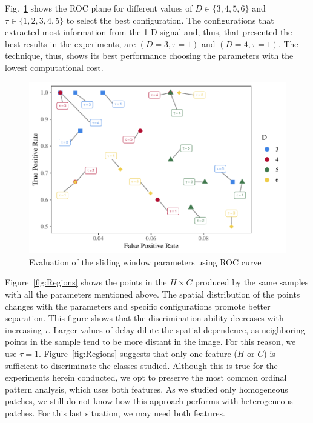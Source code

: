 \documentclass[journal]{IEEEtran}
\begin{document}
	Fig.~\ref{fig:ROC} shows the ROC plane for different values of $D \in \{3, 4, 5, 6 \} $ and $\tau \in \{1, 2, 3, 4, 5 \}$ to select the best configuration.
	The configurations that extracted most information from the \mbox{1-D} signal and, thus, that presented the best results in the experiments, are $(D = 3, \tau = 1)$ and $(D = 4, \tau = 1)$.
	The technique, thus, shows its best performance choosing the parameters with the lowest computational cost.
	
	\begin{figure}%
		\includegraphics[width=\columnwidth]{Figures/ROC.pdf}
		\caption{Evaluation of the sliding window parameters using ROC curve}
		\label{fig:ROC}
	\end{figure} 
	
	Figure~\ref{fig:Regions} shows the points in the $H\times C$ produced by the same samples with all the parameters mentioned above.
	The spatial distribution of the points changes with the parameters and specific configurations promote better separation.
	This figure shows that the discrimination ability decreases with increasing $\tau$.
	Larger values of delay dilute the spatial dependence, as neighboring points in the sample tend to be more distant in the image.
	For this reason, we use $\tau=1$. Figure~\ref{fig:Regions} suggests that only one feature ($H$ or $C$) is sufficient to discriminate the classes studied. Although this is true for the experiments herein conducted, we opt to preserve the most common ordinal pattern analysis, which uses both features. As we studied only homogeneous patches, we still do not know how this approach performs with heterogeneous patches. %
	For this last situation, we may need both features.
	
\end{document}

